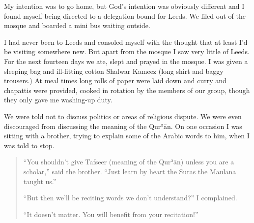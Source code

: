 \documentclass[12pt]{memoir}
\def\´{ʾ} %
\def \Quran{Qur\-\´ān} %
\def\–{-\hskip0pt}
\begin{document}
My intention was to go home, but God’s intention was obviously different
and I found myself being directed to a delegation bound for Leeds.
We filed out of the mosque and boarded a mini bus waiting outside.

I had never been to Leeds and consoled myself with the thought
that at least I’d be visiting somewhere new.
But apart from the mosque I saw very little of Leeds.
For the next fourteen days we ate, slept and prayed in the mosque.
I was given a sleeping bag and ill\–fitting cotton Shalwar Kameez
(long shirt and baggy trousers.)
At meal times long rolls of paper were laid down
and curry and chapattis were provided,
cooked in rotation by the members of our group,
though they only gave me washing-up duty.

We were told not to discuss politics or areas of religious dispute.
We were even discouraged from discussing the meaning of the \Quran.
On one occasion I was sitting with a brother,
trying to explain some of the Arabic words to him, when I was told to stop.

\begin{quote}
“You shouldn’t give Tafseer (meaning of the \Quran) unless you are a scholar,”
said the brother.
“Just learn by heart the Suras the Maulana taught us.”

“But then we’ll be reciting words we don’t understand?” I complained.

“It doesn’t matter. You will benefit from your recitation!”
\end{quote}
\end{document}
